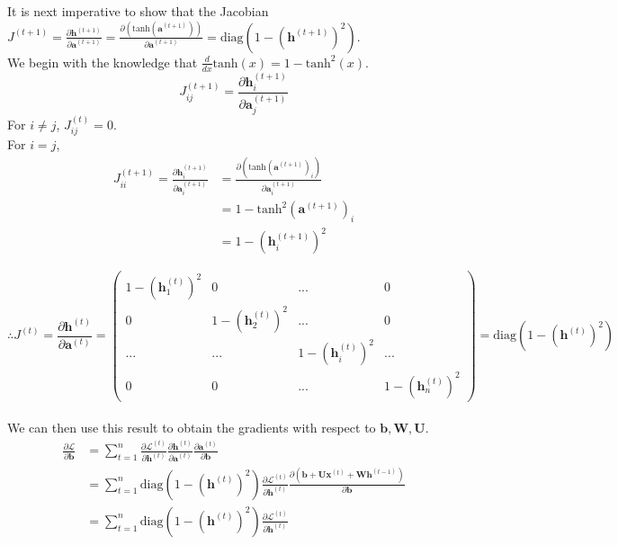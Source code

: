 \documentclass{article}
\begin{document}
It is next imperative to show that the Jacobian $J^{(t+1)} = \frac{\partial \bm{h}^{(t+1)}}{\partial \bm{a}^{(t+1)}} = \frac{\partial( \text{tanh}(\bm{a}^{(t+1)}))}{\partial \bm{a}^{(t+1)}} = \text{diag}(1 - (\bm{h}^{(t+1)})^2)$. \\

We begin with the knowledge that $\frac{d}{dx}\text{tanh}(x) = 1 - \text{tanh}^2(x)$.
	$$ J^{(t+1)}_{ij} = \frac{\partial \bm{h}^{(t+1)}_i}{\partial \bm{a}^{(t+1)}_j} $$
For $i \ne j$, $J^{(t)}_{ij} = 0$. \\
For $i = j$,
\begin{equation*}
\begin{split}
	J^{(t+1)}_{ii} = \frac{\partial \bm{h}^{(t+1)}_i}{\partial \bm{a}^{(t+1)}_i} 
		&= \frac{\partial( \text{tanh}(\bm{a}^{(t+1)})_i)}{\partial \bm{a}^{(t+1)}_i} \\
		&= 1 - \text{tanh}^2 (\bm{a}^{(t+1)})_i \\
		&= 1 - (\bm{h}^{(t+1)}_i)^2
\end{split}
\end{equation*}

	$$ \therefore J^{(t)} = \frac{\partial \bm{h}^{(t)}}{\partial \bm{a}^{(t)}} =
		\begin{pmatrix}
		1 - (\bm{h}_1^{(t)})^2 & 0 & ... & 0 \\ 
		0 & 1 - (\bm{h}_2^{(t)})^2 & ... & 0 \\ 
		... & ... & 1 - (\bm{h}_i^{(t)})^2 & ... \\ 
		0 & 0 & ... & 1 - (\bm{h}_n^{(t)})^2
		\end{pmatrix} 
		= \text{diag}(1 - (\bm{h}^{(t)})^2) $$\\


We can then use this result to obtain the gradients with respect to $\bm{b}, \bm{W}, \bm{U}$.
\begin{equation}
\label{eqn:backward-b}
\begin{split}
	\frac{\partial \mathcal{L}}{\partial \bm{b}}
		&= \sum_{t=1}^{n} \frac{\partial \mathcal{L}^{(t)}}{\partial \bm{h}^{(t)}} \frac{\partial \bm{h}^{(t)}}{\partial \bm{a}^{(t)}} \frac{\partial \bm{a}^{(t)}}{\partial \bm{b}} \\
		&= \sum_{t=1}^{n} \text{diag}(1 - (\bm{h}^{(t)})^2) \frac{\partial \mathcal{L}^{(t)}}{\partial \bm{h}^{(t)}} \frac{\partial (\bm{b} + \bm{U}\bm{x}^{(t)} + \bm{W}\bm{h}^{(t-1)})}{\partial \bm{b}} \\
		&= \sum_{t=1}^{n} \text{diag}(1 - (\bm{h}^{(t)})^2) \frac{\partial \mathcal{L}^{(t)}}{\partial \bm{h}^{(t)}}
\end{split}
\end{equation}
\end{document}
